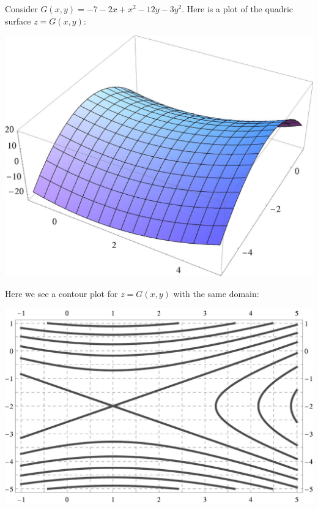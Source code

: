 \documentclass[handout,noauthor,nooutcomes]{ximera}
\begin{document}
Consider $G(x,y)= -7 - 2 x + x^2 - 12 y - 3 y^2$. Here is a plot of
the quadric surface $z=G(x,y)$:
\begin{image}[3in]
  \includegraphics{surfacePlot2.jpg}
\end{image}
Here we see a contour plot for $z = G(x,y)$ with the same domain:
\begin{image}[4in]
  \includegraphics{contours2.jpg}
\end{image}

\newpage
\end{document}
